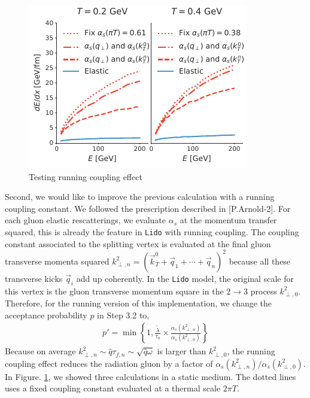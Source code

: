 \documentclass[aps, prc, reprint, amsmath, groupedaddress, nofootinbib]{revtex4-1}
\begin{document}
\begin{figure}
\includegraphics[width=\columnwidth]{Eloss_infinite_run.pdf}
\caption{Testing running coupling effect }
\label{fig:run}
\end{figure}
Second, we would like to improve the previous calculation with a running coupling constant. 
We followed the prescription described in [P.Arnold-2].
For each gluon elastic rescatterings, we evaluate $\alpha_s$ at the momentum transfer squared, this is already the feature in {\tt Lido} with running coupling.
The coupling constant associated to the splitting vertex is evaluated at the final gluon transverse momenta squared $k_{\perp,n}^2 = \left(\vec{k}_T^0+\vec{q}_1+\cdots+\vec{q}_n\right)^2$ because all these transverse kicks $\vec{q}_i$ add up coherently.
In the {\tt Lido} model, the original scale for this vertex is the gluon transverse momentum square in the $2\rightarrow 3$ process $k_{\perp,0}^2$.
Therefore, for the running version of this implementation, we change the acceptance probability $p$ in Step 3.2 to,
\begin{eqnarray}
p' = \min\left\{1, \frac{\tilde{\lambda}}{\tau_n}\times\frac{\alpha_s(k_{\perp,n}^2)}{\alpha_s(k_{\perp,0}^2)}\right\}
\end{eqnarray}
Because on average $k_{\perp,n}^2 \sim \hat{q}\tau_{f,n} \sim \sqrt{\hat{q}\omega}$ is larger than $k_{\perp,0}^2$, the running coupling effect reduces the radiation gluon by a factor of  $\alpha_s(k_{\perp,n}^2)/\alpha_s(k_{\perp,0}^2)$.
In Figure. \ref{fig:run}, we showed three calculations in a static medium. The dotted lines uses a fixed coupling constant evaluated at a thermal scale $2\pi T$.
\end{document}
